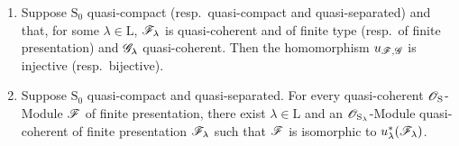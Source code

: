 \begin{theorem}[8.5.2]
\label{IV.8.5.2}
\begin{enumerate}[label=(\roman*)]
  \item Suppose $\mathrm{S}_0$ quasi-compact (resp.\ quasi-compact and quasi-separated) and that, for some $\lambda\in\mathrm{L}$, $\mathscr{F}_\lambda$ is quasi-coherent and of finite type (resp.\ of finite presentation) and $\mathscr{G}_\lambda$ quasi-coherent.
Then the homomorphism $u_{\mathscr{F},\mathscr{G}}$ is injective (resp.\ bijective).
  \item Suppose $\mathrm{S}_0$ quasi-compact and quasi-separated.
For every quasi-coherent $\mathscr{O}_\mathrm{S}$-Module $\mathscr{F}$ of finite presentation, there exist $\lambda\in\mathrm{L}$ and an $\mathscr{O}_{\mathrm{S}_\lambda}$-Module quasi-coherent of finite presentation $\mathscr{F}_\lambda$ such that $\mathscr{F}$ is isomorphic to $u_\lambda^*(\mathscr{F}_\lambda)$.
\end{enumerate}
\end{theorem}

